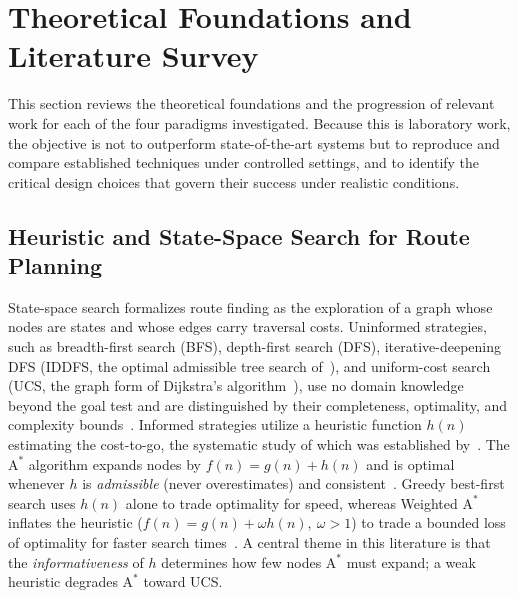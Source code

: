 \documentclass{ai-lab-report}
\begin{document}
\section{Theoretical Foundations and Literature Survey}
\label{sec:litreview}\label{sec:foundations}
This section reviews the theoretical foundations and the progression of relevant work for each of the four paradigms investigated. Because this is laboratory work, the objective is not to outperform state-of-the-art systems but to reproduce and compare established techniques under controlled settings, and to identify the critical design choices that govern their success under realistic conditions.

\subsection{Heuristic and State-Space Search for Route Planning}
State-space search formalizes route finding as the exploration of a graph whose nodes are states and whose edges carry traversal costs. Uninformed strategies, such as breadth-first search (BFS), depth-first search (DFS), iterative-deepening DFS (IDDFS, the optimal admissible tree search of~\citet{korf1985iddfs}), and uniform-cost search (UCS, the graph form of Dijkstra's algorithm~\citep{dijkstra1959note}), use no domain knowledge beyond the goal test and are distinguished by their completeness, optimality, and complexity bounds~\citep{russell2021ai}. Informed strategies utilize a heuristic function $h(n)$ estimating the cost-to-go, the systematic study of which was established by~\citet{pearl1984heuristics}. The $\text{A}^\ast$ algorithm expands nodes by $f(n)=g(n)+h(n)$ and is optimal whenever $h$ is \emph{admissible} (never overestimates) and consistent~\citep{hart1968astar}. Greedy best-first search uses $h(n)$ alone to trade optimality for speed, whereas Weighted $\text{A}^\ast$ inflates the heuristic ($f(n)=g(n)+\omega h(n),\ \omega>1$) to trade a bounded loss of optimality for faster search times~\citep{pohl1970weighted}. A central theme in this literature is that the \emph{informativeness} of $h$ determines how few nodes $\text{A}^\ast$ must expand; a weak heuristic degrades $\text{A}^\ast$ toward UCS.
\end{document}
